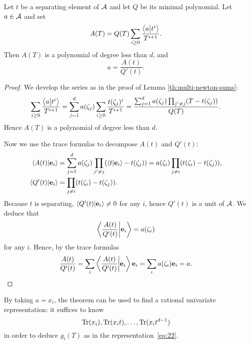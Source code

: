 \begin{theorem}
  \label{th:rur}
  Let $t$ be a separating element of $\mathcal{A}$ and let $Q$ be its
  minimal polynomial. Let $a\in\mathcal{A}$ and set
  \begin{equation}
    \label{eq:38}
    A(T) = Q(T)\sum_{i\ge0}\frac{\left\langle a \middle| t^i \right\rangle}{T^{i+1}}
    \text{.}
  \end{equation}
  Then $A(T)$ is a polynomial of degree less than $d$, and
  \begin{equation}
    \label{eq:39}
    a = \frac{A(t)}{Q'(t)}
    \text{.}
  \end{equation}
\end{theorem}
\begin{proof}
  We develop the series as in the proof of Lemma
  \ref{th:multi-newton-sums}:
  \begin{equation}
    \label{eq:40}
    \sum_{i\ge0}\frac{\left\langle a \middle| t^i \right\rangle}{T^{i+1}} =
    \sum_{j=1}^da(\zeta_j)\sum_{i\ge0}\frac{t(\zeta_j)^i}{T^{i+1}}=
    \frac{\sum_{j=1}^da(\zeta_j)\prod_{j'\ne j}(T-t(\zeta_j))}{Q(T)}
    \text{.}
  \end{equation}
  Hence $A(T)$ is a polynomial of degree less than $d$.

  Now we use the trace formulas to decompose 
  $A(t)$ and $Q'(t)$:
  \begin{align}
    \label{eq:41}
    \left\langle A(t) \middle| \mathbf{e}_i \right\rangle &=
    \sum_{j=1}^d a(\zeta_j)\prod_{j'\ne j}(\left\langle t \middle| \mathbf{e}_i \right\rangle-t(\zeta_j)) =
    a(\zeta_i)\prod_{j\ne i}(t(\zeta_i)-t(\zeta_j))
    \text{,}\\
    \left\langle Q'(t) \middle| \mathbf{e}_i \right\rangle &=
    \prod_{j\ne i}(t(\zeta_i)-t(\zeta_j))
    \text{.}
  \end{align}
  Because $t$ is separating, $\left\langle Q'(t) \middle| \mathbf{e}_i \right\rangle\ne0$ for any
  $i$, hence $Q'(t)$ is a unit of $\mathcal{A}$. We deduce that
  \begin{equation}
    \label{eq:42}
    \left\langle \frac{A(t)}{Q'(t)} \middle| \mathbf{e}_i \right\rangle = a(\zeta_i)
  \end{equation}
  for any $i$. Hence, by the trace formulas
  \begin{equation}
    \label{eq:43}
    \frac{A(t)}{Q'(t)} = \sum_i\left\langle \frac{A(t)}{Q'(t)} \middle| \mathbf{e}_i \right\rangle\mathbf{e}_i =
    \sum_i a(\zeta_i)\mathbf{e}_i = a
    \text{.}
  \end{equation}
\end{proof}

By taking $a=x_i$, the theorem can be used to find a rational
univariate representation: it suffices to know
\begin{equation}
  \label{eq:44}
  \operatorname{Tr}(x_i),\operatorname{Tr}(x_it),\ldots,\operatorname{Tr}(x_it^{d-1})
\end{equation}
in order to deduce $g_i(T)$ as in the representation~\eqref{eq:22}.

